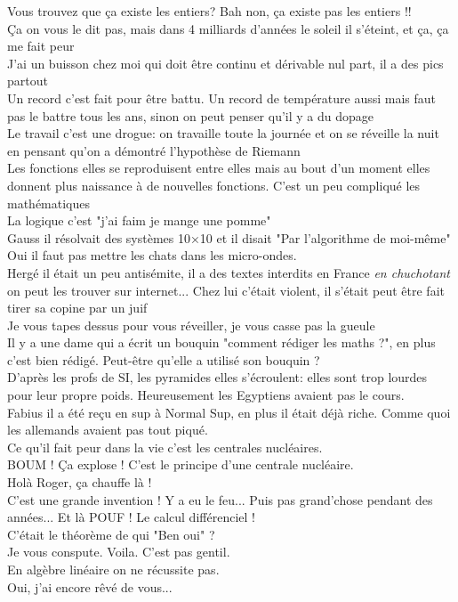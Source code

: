 \documentclass[french, a4paper, openany]{book}
\begin{document}
	\noindent \og Vous trouvez que ça existe les entiers? Bah non, ça existe pas les entiers !! \fg \\
	\og Ça on vous le dit pas, mais dans 4 milliards d'années le soleil il s'éteint, et ça, ça me fait peur \fg \\
	\og J'ai un buisson chez moi qui doit être continu et dérivable nul part, il a des pics partout \fg \\
	\og Un record c'est fait pour être battu. Un record de température aussi mais faut pas le battre tous les ans, sinon on peut penser qu'il y a du dopage \fg \\
	\og Le travail c'est une drogue: on travaille toute la journée et on se réveille la nuit en pensant qu'on a démontré l'hypothèse de Riemann \fg \\
	\og Les fonctions elles se reproduisent entre elles mais au bout d'un moment elles donnent plus naissance à de nouvelles fonctions. C'est un peu compliqué les mathématiques \fg \\
	\og La logique c'est "j'ai faim je mange une pomme" \fg \\
	\og Gauss il résolvait des systèmes 10×10 et il disait "Par l'algorithme de moi-même" \fg \\
	\og Oui il faut pas mettre les chats dans les micro-ondes. \fg \\
	\og Hergé il était un peu antisémite, il a des textes interdits en France \emph{en chuchotant} on peut les trouver sur internet... Chez lui c'était violent, il s'était peut être fait tirer sa copine par un juif \fg \\
	\og Je vous tapes dessus pour vous réveiller, je vous casse pas la gueule \fg \\
	\og Il y a une dame qui a écrit un bouquin "comment rédiger les maths ?", en plus c'est bien rédigé. Peut-être qu'elle a utilisé son bouquin ? \fg \\
	\og D'après les profs de SI, les pyramides elles s'écroulent: elles sont trop lourdes pour leur propre poids. Heureusement les Egyptiens avaient pas le cours. \fg \\
	\og Fabius il a été reçu en sup à Normal Sup, en plus il était déjà riche. Comme quoi les allemands avaient pas tout piqué. \fg \\
	\og Ce qu'il fait peur dans la vie c'est les centrales nucléaires. \fg \\
	\og BOUM ! Ça explose ! C'est le principe d'une centrale nucléaire. \fg \\
	\og Holà Roger, ça chauffe là ! \fg \\
	\og C'est une grande invention ! Y a eu le feu... Puis pas grand'chose pendant des années... Et là POUF ! Le calcul différenciel ! \fg \\
	\og C'était le théorème de qui "Ben oui" ? \fg \\
	\og Je vous conspute. Voila. C'est pas gentil. \fg \\
	\og En algèbre linéaire on ne récussite pas. \fg \\
	\og Oui, j'ai encore rêvé de vous... \fg \\
\end{document}
